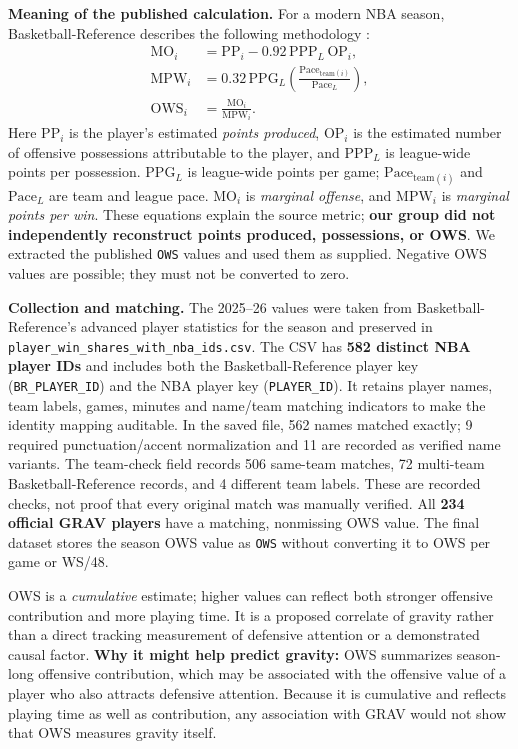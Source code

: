 \documentclass[11pt]{article}
\begin{document}
\textbf{Meaning of the published calculation.} For a modern NBA season,
Basketball-Reference describes the following methodology
\cite{winshares}:
\begin{align}
 \mathrm{MO}_i & = \mathrm{PP}_i - 0.92\,\mathrm{PPP}_{L}\,\mathrm{OP}_i,
 \label{eq:ows-marginal}\\
 \mathrm{MPW}_{i} & =0.32\,\mathrm{PPG}_{L}
 \left(\frac{\mathrm{Pace}_{\mathrm{team}(i)}}{\mathrm{Pace}_{L}}\right),
 \label{eq:ows-points}\\
 \mathrm{OWS}_i & = \frac{\mathrm{MO}_i}{\mathrm{MPW}_i}.
 \label{eq:ows-method}
\end{align}
Here $\mathrm{PP}_i$ is the player's estimated \emph{points produced},
$\mathrm{OP}_i$ is the estimated number of offensive possessions attributable
to the player, and $\mathrm{PPP}_{L}$ is league-wide points per possession.
$\mathrm{PPG}_{L}$ is league-wide points per game;
$\mathrm{Pace}_{\mathrm{team}(i)}$ and $\mathrm{Pace}_{L}$ are team and
league pace. $\mathrm{MO}_i$ is \emph{marginal offense}, and
$\mathrm{MPW}_i$ is \emph{marginal points per win}. These equations explain
the source metric; \textbf{our group did not independently reconstruct
points produced, possessions, or OWS}. We extracted the published \texttt{OWS}
values and used them as supplied. Negative OWS values are possible; they
must not be converted to zero.

\textbf{Collection and matching.} The 2025--26 values were taken from
Basketball-Reference's advanced player statistics for the season
\cite{br-advanced} and preserved in
\texttt{player\_win\_shares\_with\_nba\_ids.csv}. The CSV has
\textbf{582 distinct NBA player IDs} and includes both the
Basketball-Reference player key (\texttt{BR\_PLAYER\_ID}) and the NBA
player key (\texttt{PLAYER\_ID}). It retains player names, team labels,
games, minutes and name/team matching indicators to make the identity
mapping auditable. In the saved file, 562 names matched exactly; 9 required
punctuation/accent normalization and 11 are recorded as verified name
variants. The team-check field records 506 same-team matches, 72
multi-team Basketball-Reference records, and 4 different team labels.
These are recorded checks, not proof that every original match was
manually verified. All \textbf{234 official GRAV players} have a matching,
nonmissing OWS value. The final dataset stores the season OWS value as
\texttt{OWS} without converting it to OWS per game or WS/48.

OWS is a \emph{cumulative} estimate; higher values can reflect both stronger
offensive contribution and more playing time. It is a proposed correlate
of gravity rather than a direct tracking measurement of defensive
attention or a demonstrated causal factor.
\textbf{Why it might help predict gravity:} OWS summarizes season-long
offensive contribution, which may be associated with the offensive value
of a player who also attracts defensive attention. Because it is cumulative
and reflects playing time as well as contribution, any association with
GRAV would not show that OWS measures gravity itself.
\end{document}

